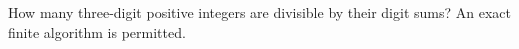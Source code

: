 How many three-digit positive integers are divisible by their digit sums? An exact finite algorithm is permitted.
